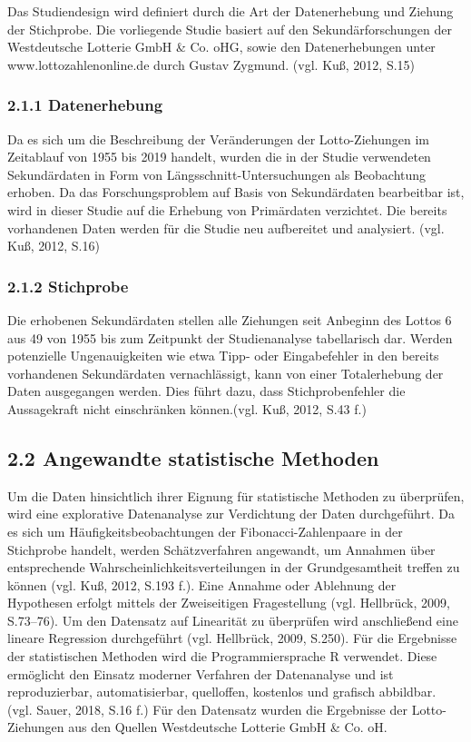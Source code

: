 \documentclass[ngerman,]{article}
\begin{document}
Das Studiendesign wird definiert durch die Art der Datenerhebung und
Ziehung der Stichprobe. Die vorliegende Studie basiert auf den
Sekundärforschungen der Westdeutsche Lotterie GmbH \& Co. oHG, sowie den
Datenerhebungen unter www.lottozahlenonline.de durch Gustav Zygmund.
(vgl. Kuß, 2012, S.15)

\subsubsection{2.1.1 Datenerhebung}\label{datenerhebung}

Da es sich um die Beschreibung der Veränderungen der Lotto-Ziehungen im
Zeitablauf von 1955 bis 2019 handelt, wurden die in der Studie
verwendeten Sekundärdaten in Form von Längsschnitt-Untersuchungen als
Beobachtung erhoben. Da das Forschungsproblem auf Basis von
Sekundärdaten bearbeitbar ist, wird in dieser Studie auf die Erhebung
von Primärdaten verzichtet. Die bereits vorhandenen Daten werden für die
Studie neu aufbereitet und analysiert. (vgl. Kuß, 2012, S.16)

\subsubsection{2.1.2 Stichprobe}\label{stichprobe}

Die erhobenen Sekundärdaten stellen alle Ziehungen seit Anbeginn des
Lottos 6 aus 49 von 1955 bis zum Zeitpunkt der Studienanalyse
tabellarisch dar. Werden potenzielle Ungenauigkeiten wie etwa Tipp- oder
Eingabefehler in den bereits vorhandenen Sekundärdaten vernachlässigt,
kann von einer Totalerhebung der Daten ausgegangen werden. Dies führt
dazu, dass Stichprobenfehler die Aussagekraft nicht einschränken
können.(vgl. Kuß, 2012, S.43 f.)

\subsection{2.2 Angewandte statistische
Methoden}\label{angewandte-statistische-methoden}

Um die Daten hinsichtlich ihrer Eignung für statistische Methoden zu
überprüfen, wird eine explorative Datenanalyse zur Verdichtung der Daten
durchgeführt. Da es sich um Häufigkeitsbeobachtungen der
Fibonacci-Zahlenpaare in der Stichprobe handelt, werden Schätzverfahren
angewandt, um Annahmen über entsprechende
Wahrscheinlichkeitsverteilungen in der Grundgesamtheit treffen zu können
(vgl. Kuß, 2012, S.193 f.). Eine Annahme oder Ablehnung der Hypothesen
erfolgt mittels der Zweiseitigen Fragestellung (vgl. Hellbrück, 2009,
S.73--76). Um den Datensatz auf Linearität zu überprüfen wird
anschließend eine lineare Regression durchgeführt (vgl. Hellbrück, 2009,
S.250). Für die Ergebnisse der statistischen Methoden wird die
Programmiersprache R verwendet. Diese ermöglicht den Einsatz moderner
Verfahren der Datenanalyse und ist reproduzierbar, automatisierbar,
quelloffen, kostenlos und grafisch abbildbar. (vgl. Sauer, 2018, S.16
f.) Für den Datensatz wurden die Ergebnisse der Lotto-Ziehungen aus den
Quellen Westdeutsche Lotterie GmbH \& Co. oH.
\end{document}
